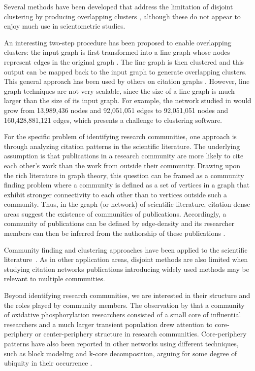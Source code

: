 \documentclass[12pt, oneside]{article}   	%
\begin{document}
Several methods have been developed that address the limitation of disjoint clustering by producing overlapping clusters \citep{Baumes2005,Palla2005,banerjee2005model,Cleuziou2008,Lancichinetti2009,Lu2012,yang2013overlapping},  although these do not appear to enjoy much use in scientometric studies. 

An interesting two-step procedure has been proposed to enable overlapping clusters: the input graph is first transformed into a line graph whose nodes represent edges in the original graph \citep{Harary1960}.  The line graph is then clustered and this output can be mapped back to the input graph to generate overlapping clusters. This general approach has been used by others on citation graphs \citep{Evans2009,Havemann2018,Havemann2021}. However, line graph  techniques are not very scalable, since the size of a line graph is much larger than the size of its input graph. For example, the network studied in \cite{Wedell2022} would grow from 13,989,436 nodes and 92,051,051 edges to 92,051,051 nodes and 160,428,881,121 edges, which presents a challenge to clustering software. 
 
For the specific problem of identifying research communities, one approach is through analyzing citation patterns in the scientific literature. The underlying assumption is that publications in a research community are more likely to cite each other's work than the work from outside their community. Drawing upon the rich literature in graph theory, this question can be framed as a community finding problem where a community is defined as a set of vertices in a graph that exhibit stronger connectivity to each other than to vertices outside such a community. Thus, in the graph (or network) of scientific literature, citation-dense areas suggest the existence of communities of publications. Accordingly, a community of publications can be defined by edge-density and its researcher members can then be inferred from the authorship of these publications \citep{Chandrasekharan2021,Wedell2022}. 


Community finding and clustering approaches have been applied to the scientific literature~\citep{Newman2006,Fortunato2009,Boyack2010,Boyack2019,Traag2019,Ahlgren2020,Chandrasekharan2021,Wedell2022}. As in other application areas, disjoint methods are also limited when studying citation networks  publications introducing widely used methods may be relevant to multiple communities.
	
Beyond identifying research communities, we are interested in their structure and the roles played by community members.  The observation by \cite{Price1966} that a community of oxidative phosphorylation researchers consisted of a small core of influential researchers and a much larger transient population drew attention to core-periphery or center-periphery structure in research communities. Core-periphery patterns have also been reported in other networks using different techniques, such as block modeling and k-core decomposition, arguing for some degree of ubiquity in their occurrence \citep{borgatti2000models,Breiger2014,Zhang2015,Rombach2017,gallagher2021clarified,yanchenko_2202.04455}. 	
\end{document}

